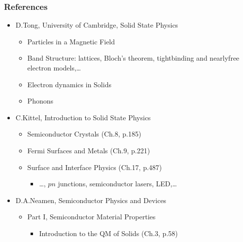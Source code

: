 \documentclass[letterpaper,10pt,english]{jupyterBook}
\begin{document}
\subsubsection*{References}
\begin{itemize}
\item {} 
\sphinxAtStartPar
D.Tong, University of Cambridge, Solid State Physics
\begin{itemize}
\item {} 
\sphinxAtStartPar
Particles in a Magnetic Field

\item {} 
\sphinxAtStartPar
Band Structure: lattices, Bloch’s theorem, tight\sphinxhyphen{}binding and nearly\sphinxhyphen{}free electron models,…

\item {} 
\sphinxAtStartPar
Electron dynamics in Solids

\item {} 
\sphinxAtStartPar
Phonons

\end{itemize}

\item {} 
\sphinxAtStartPar
C.Kittel, Introduction to Solid State Physics
\begin{itemize}
\item {} 
\sphinxAtStartPar
Semiconductor Crystals (Ch.8, p.185)

\item {} 
\sphinxAtStartPar
Fermi Surfaces and Metals (Ch.9, p.221)

\item {} 
\sphinxAtStartPar
Surface and Interface Physics (Ch.17, p.487)
\begin{itemize}
\item {} 
\sphinxAtStartPar
…, \(p\)\sphinxhyphen{}\(n\) junctions, semiconductor lasers, LED,…

\end{itemize}

\end{itemize}

\item {} 
\sphinxAtStartPar
D.A.Neamen, Semiconductor Physics and Devices
\begin{itemize}
\item {} 
\sphinxAtStartPar
Part I, Semiconductor Material Properties
\begin{itemize}
\item {} 
\sphinxAtStartPar
Introduction to the QM of Solids (Ch.3, p.58)


\end{itemize}
\end{itemize}
\end{itemize}
\end{document}
